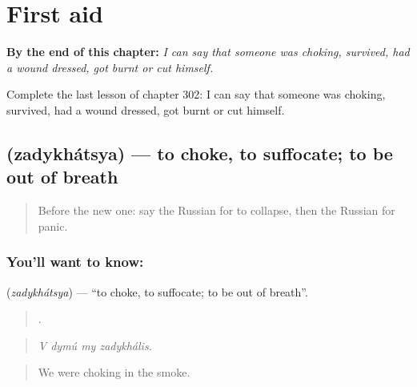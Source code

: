 
\chapter{First aid}
\label{ch:ru-first-aid}

\begin{chapteropening}
\textbf{By the end of this chapter:} \emph{I can say that someone was choking, survived, had a wound dressed, got burnt or cut himself.}

Complete the last lesson of chapter 302: I can say that someone was choking, survived, had a wound dressed, got burnt or cut himself.
\end{chapteropening}

\section[\texorpdfstring{\ru{задыхаться} (zadykhátsya)}{задыхаться (zadykhátsya)}]{ (zadykhátsya) — to choke, to suffocate; to be out of breath}

\label{lesson:RU-C302-zadykhatsya}



\begin{quote}
Before the new one: say the Russian for to collapse, then the Russian for panic.
\end{quote}

\subsection*{You'll want to know: }
\textbf{} (\emph{zadykhátsya}) — \textquotedblleft{}to choke, to suffocate; to be out of breath\textquotedblright{}.

\begin{quote}
   .
\end{quote}

\begin{quote}
\emph{V dymú my zadykhális.}
\end{quote}

\begin{quote}
We were choking in the smoke.
\end{quote}

